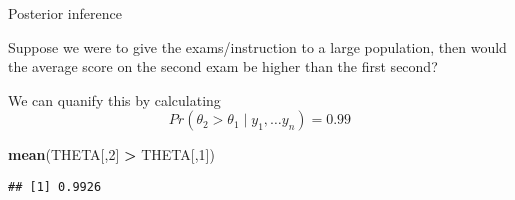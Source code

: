 \documentclass[ignorenonframetext,]{beamer}
\newenvironment{Shaded}{\begin{snugshade}}{\end{snugshade}}
\newcommand{\KeywordTok}[1]{\textcolor[rgb]{0.13,0.29,0.53}{\textbf{#1}}}
\newcommand{\DecValTok}[1]{\textcolor[rgb]{0.00,0.00,0.81}{#1}}
\newcommand{\StringTok}[1]{\textcolor[rgb]{0.31,0.60,0.02}{#1}}
\newcommand{\OperatorTok}[1]{\textcolor[rgb]{0.81,0.36,0.00}{\textbf{#1}}}
\newcommand{\NormalTok}[1]{#1}
\begin{document}
\begin{frame}[fragile]{Posterior inference}

Suppose we were to give the exams/instruction to a large population,
then would the average score on the second exam be higher than the first
second?

We can quanify this by calculating
\[Pr(\theta_2 > \theta_1 \mid y_1,\ldots y_n) = 0.99 
\]

\begin{Shaded}
\begin{Highlighting}[]
\KeywordTok{mean}\NormalTok{(THETA[,}\DecValTok{2}\NormalTok{] }\OperatorTok{>}\StringTok{ }\NormalTok{THETA[,}\DecValTok{1}\NormalTok{])}
\end{Highlighting}
\end{Shaded}

\begin{verbatim}
## [1] 0.9926
\end{verbatim}

\end{frame}
\end{document}
